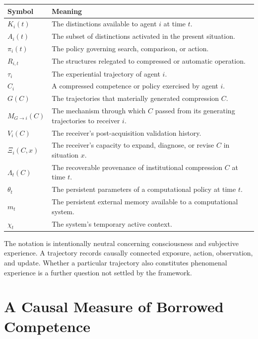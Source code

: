 \documentclass[11pt]{article}
\begin{document}
\begin{center}
\renewcommand{\arraystretch}{1.3}
\begin{tabular}{>{\raggedright\arraybackslash}p{}
                >{\raggedright\arraybackslash}p{}}
\toprule
\textbf{Symbol} & \textbf{Meaning} \\
\midrule
$K_i(t)$
&
The distinctions available to agent $i$ at time $t$.
\\
$A_i(t)$
&
The subset of distinctions activated in the present situation.
\\
$\pi_i(t)$
&
The policy governing search, comparison, or action.
\\
$R_{i,t}$
&
The structures relegated to compressed or automatic operation.
\\
$\tau_i$
&
The experiential trajectory of agent $i$.
\\
$C_i$
&
A compressed competence or policy exercised by agent $i$.
\\
$G(C)$
&
The trajectories that materially generated compression $C$.
\\
$M_{G\to i}(C)$
&
The mechanism through which $C$ passed from its generating trajectories to receiver $i$.
\\
$V_i(C)$
&
The receiver's post-acquisition validation history.
\\
$\Xi_i(C,x)$
&
The receiver's capacity to expand, diagnose, or revise $C$ in situation $x$.
\\
$\Lambda_t(C)$
&
The recoverable provenance of institutional compression $C$ at time $t$.
\\
$\theta_t$
&
The persistent parameters of a computational policy at time $t$.
\\
$m_t$
&
The persistent external memory available to a computational system.
\\
$\chi_t$
&
The system's temporary active context.
\\
\bottomrule
\end{tabular}
\end{center}

The notation is intentionally neutral concerning consciousness and subjective experience. A trajectory records causally connected exposure, action, observation, and update. Whether a particular trajectory also constitutes phenomenal experience is a further question not settled by the framework.

\section{A Causal Measure of Borrowed Competence}
\end{document}
